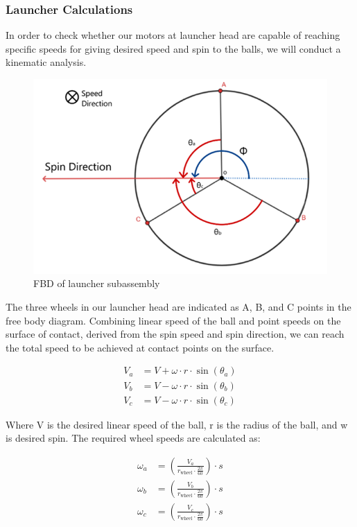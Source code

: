 \documentclass[12pt]{article}
\begin{document}
\subsubsection{Launcher Calculations}

In order to check whether our motors at launcher head are capable of reaching specific speeds for giving desired speed and spin to the balls, we will conduct a kinematic analysis.

\begin{figure}[h!]
    \centering
    \includegraphics[width=0.4\linewidth]{3.1.1.png}
    \caption{FBD of launcher subassembly}
    \label{fig:enter-label}
\end{figure}

The three wheels in our launcher head are indicated as A, B, and C points in the free body diagram.  Combining linear speed of the ball and point speeds on the surface of contact, derived from the spin speed and spin direction, we can reach the total speed to be achieved at contact points on the surface.

\begin{align}
    V_a &= V + \omega \cdot r \cdot \sin(\theta_a) \\[-0.5pt]
    V_b &= V - \omega \cdot r \cdot \sin(\theta_b) \\[-0.5pt]
    V_c &= V - \omega \cdot r \cdot \sin(\theta_c)
\end{align}

Where V is the desired linear speed of the ball, r is the radius of the ball, and w is desired spin.
The required wheel speeds are calculated as:

\begin{align}
    \omega_a &= \left( \frac{V_a}{r_{\text{wheel}} \cdot \frac{2\pi}{60}} \right) \cdot s \\[-0.5pt]
    \omega_b &= \left( \frac{V_b}{r_{\text{wheel}} \cdot \frac{2\pi}{60}} \right) \cdot s \\[-0.5pt]
    \omega_c &= \left( \frac{V_c}{r_{\text{wheel}} \cdot \frac{2\pi}{60}} \right) \cdot s
\end{align}
\end{document}
